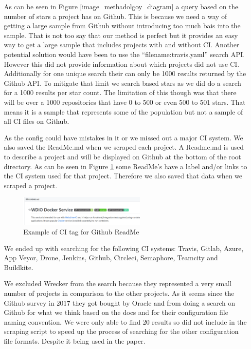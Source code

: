\documentclass[10pt,conference]{IEEEtran}
\begin{document}
As can be seen in Figure \ref{image_methadolgoy_diagram} a query based on the number of stars a project has on Github. This is because we need a way of getting a large sample from Github without introducing too much bais into the sample. That is not too say that our method is perfect but it provides an easy way to get a large sample that includes projects with and without CI.
Another potential solution would have been to use the \enquote{filename:travis.yaml} search API. However this did not provide information about which projects did not use CI. Additionally for one unique search their can only be 1000 results returned by the Github API. To mitigate that limit we search based stars as we did do a search for a 1000 results per star count. The limitation of this though was that there will be over a 1000 repositories that have 0 to 500 or even 500 to 501 stars. That means it is a sample that represents some of the population but not a sample of all CI files on Github. 

As the config could have mistakes in it or we missed out a major CI system. We also saved the ReadMe.md when we scraped each project. A Readme.md is used to describe a project and will be displayed on Github at the bottom of the root directory. As can be seen in Figure \ref{ExampleGithubReadme} some ReadMe's have a label and/or links to the CI system used for that project. Therefore we also saved that data when we scraped a project. 

\begin{figure}[!t]
  \centering
  \includegraphics[scale=0.5, width=2.5in]{2020-01-30-08-29-04.png}
  
  \caption[alt text]{Example of CI tag for Github ReadMe \cite{GithubReadMeExample}}
  \label{ExampleGithubReadme}
\end{figure}

We ended up with searching for the following CI systems: Travis, Gitlab, Azure, App Veyor, Drone, Jenkins, Github, Circleci, Semaphore, Teamcity and Buildkite. 

We excluded Wrecker from the search because they represented a very small number of projects in comparison to the other projects. As it seems since the Github survey in 2017 they got bought by Oracle and from doing a search on Github for what we think based on the docs \cite{WreckerDocs} and \cite{WreckerOpenSourceGithubSearch} for their configuration file naming convention. We were only able to find 20 results so did not include in the scraping script to speed up the process of searching for the other configuration file formats. Despite it being used in the \citet{Hilton2016} paper.
\end{document}
